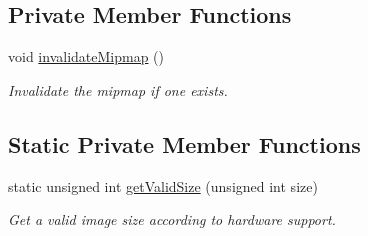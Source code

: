 \subsection*{Private Member Functions}
\begin{DoxyCompactItemize}
\item 
void \mbox{\hyperlink{classsf_1_1_texture_a7657c59adfbc0c640e54f7e3f12787aa}{invalidate\+Mipmap}} ()
\begin{DoxyCompactList}\small\item\em Invalidate the mipmap if one exists. \end{DoxyCompactList}\end{DoxyCompactItemize}
\subsection*{Static Private Member Functions}
\begin{DoxyCompactItemize}
\item 
static unsigned int \mbox{\hyperlink{classsf_1_1_texture_a8a2aea2ef4e24f5f8eb25374631a1802}{get\+Valid\+Size}} (unsigned int size)
\begin{DoxyCompactList}\small\item\em Get a valid image size according to hardware support. \end{DoxyCompactList}\end{DoxyCompactItemize}
